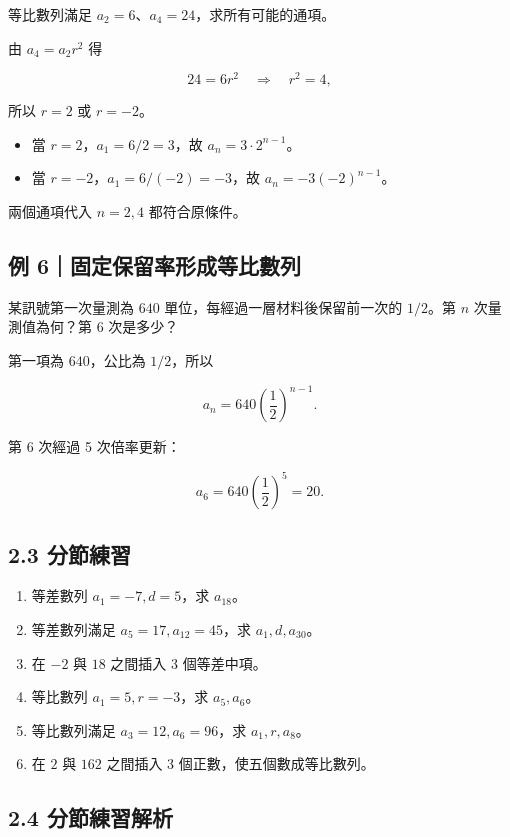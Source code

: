 \documentclass[11pt,a4paper]{article}
\providecommand{\tightlist}{%
  \setlength{\itemsep}{0pt}\setlength{\parskip}{0pt}}
\begin{document}
等比數列滿足 \(a_2=6\)、\(a_4=24\)，求所有可能的通項。

由 \(a_4=a_2r^2\) 得

\[
24=6r^2\quad\Longrightarrow\quad r^2=4,
\]

所以 \(r=2\) 或 \(r=-2\)。

\begin{itemize}
\tightlist
\item
  當 \(r=2\)，\(a_1=6/2=3\)，故 \(a_n=3\cdot2^{n-1}\)。
\item
  當 \(r=-2\)，\(a_1=6/(-2)=-3\)，故 \(a_n=-3(-2)^{n-1}\)。
\end{itemize}

兩個通項代入 \(n=2,4\) 都符合原條件。

\subsection{例 6｜固定保留率形成等比數列}\label{ux4f8b-6ux56faux5b9aux4fddux7559ux7387ux5f62ux6210ux7b49ux6bd4ux6578ux5217}

某訊號第一次量測為 \(640\) 單位，每經過一層材料後保留前一次的 \(1/2\)。第 \(n\) 次量測值為何？第 6 次是多少？

第一項為 \(640\)，公比為 \(1/2\)，所以

\[
a_n=640\left(\frac12\right)^{n-1}.
\]

第 6 次經過 5 次倍率更新：

\[
a_6=640\left(\frac12\right)^5=20.
\]

\subsection{2.3 分節練習}\label{ux5206ux7bc0ux7df4ux7fd2-1}

\begin{enumerate}
\def\labelenumi{\arabic{enumi}.}
\tightlist
\item
  等差數列 \(a_1=-7,d=5\)，求 \(a_{18}\)。
\item
  等差數列滿足 \(a_5=17,a_{12}=45\)，求 \(a_1,d,a_{30}\)。
\item
  在 \(-2\) 與 \(18\) 之間插入 3 個等差中項。
\item
  等比數列 \(a_1=5,r=-3\)，求 \(a_5,a_6\)。
\item
  等比數列滿足 \(a_3=12,a_6=96\)，求 \(a_1,r,a_8\)。
\item
  在 \(2\) 與 \(162\) 之間插入 3 個正數，使五個數成等比數列。
\end{enumerate}

\subsection{2.4 分節練習解析}\label{ux5206ux7bc0ux7df4ux7fd2ux89e3ux6790-1}
\end{document}
